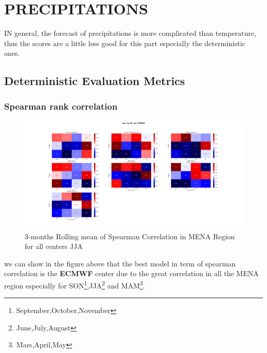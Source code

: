 \section{PRECIPITATIONS}




IN general, the forecast of precipitations is more complicated than temperature, thus the scores are a little less good for this part especially the deterministic ones. 

    

\subsection{Deterministic Evaluation Metrics}

\subsubsection{Spearman rank correlation}

\begin{figure}[H]
\includegraphics[scale=0.3]{corr_RR_PERIOD.png}
\caption{3-months Rolling mean of Spearman Correlation in MENA Region for all centers JJA}
\end{figure}

we can show in the figure above that the best model in term of spearman correlation is the \textbf{ECMWF} center due to the great correlation in all the MENA region especially for   SON\footnote{September,October,November},JJA\footnote{June,July,August} and MAM\footnote{Mars,April,May}.

